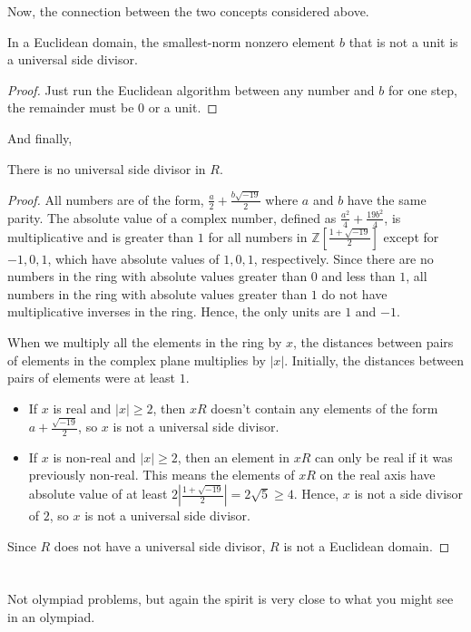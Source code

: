Now, the connection between the two concepts considered above.
\begin{lemma}
	In a Euclidean domain,
	the smallest-norm nonzero element $b$ that is not a unit is a universal side divisor.
\end{lemma}
\begin{proof}
	Just run the Euclidean algorithm between any number and $b$ for one step, the remainder must be
	$0$ or a unit.
\end{proof}

And finally,
\begin{proposition}
	There is no universal side divisor in $R$.
\end{proposition}
\begin{proof}
All numbers are of the form, $\frac{a}{2} + \frac{b\sqrt{-19}}{2}$ where $a$ and $b$ have the same parity. The absolute value of a complex number, defined as $\frac{a^2}{4} + \frac{19b^2}{4}$, is multiplicative and is greater than $1$ for all numbers in $\mathbb Z [\frac{1+\sqrt{-19}}{2}]$ except for $-1, 0, 1$, which have absolute values of $1, 0, 1$, respectively. Since there are no numbers in the ring with absolute values greater than $0$ and less than $1$, all numbers in the ring with absolute values greater than $1$ do not have multiplicative inverses in the ring. Hence, the only units are $1$ and $-1$.

When we multiply all the elements in the ring by $x$, the distances between pairs of elements in the complex plane multiplies by $|x|$. Initially, the distances between pairs of elements were at least $1$.
\begin{itemize}
\item If $x$ is real and $|x| \geq 2$, then $xR$ doesn't contain any elements of the form $a + \frac{\sqrt{-19}}{2}$, so $x$ is not a universal side divisor.
\item If $x$ is non-real and $|x| \geq 2$, then an element in $xR$ can only be real if it was previously non-real. This means the elements of $xR$ on the real axis have absolute value of at least $2|\frac{1+\sqrt{-19}}{2}| = 2\sqrt{5} \geq 4$. Hence, $x$ is not a side divisor of $2$, so $x$ is not a universal side divisor.
\end{itemize}
Since $R$ does not have a universal side divisor, $R$ is not a Euclidean domain.
\end{proof}

\section{\problemhead}
Not olympiad problems, but again the spirit is very close
to what you might see in an olympiad.

